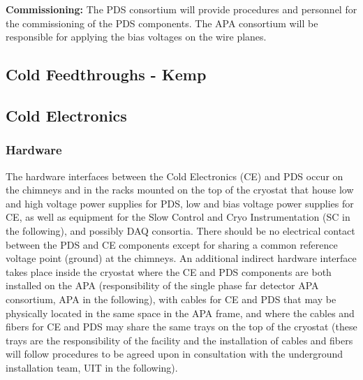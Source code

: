
\textbf{Commissioning: }
The PDS consortium will provide procedures and personnel for the commissioning of the PDS components.
The APA consortium will be responsible for applying the bias voltages on the wire planes. 

\subsection{\color{red}\bf Cold Feedthroughs - Kemp}
\label{sec:fdsp-pd-intfc-feed}


\subsection{Cold Electronics}
\label{sec:fdsp-pd-intfc-feed}

\subsubsection{Hardware}
The hardware interfaces between the Cold Electronics (CE) and PDS occur on the chimneys and in the racks mounted on the top of the cryostat that house low and high voltage power supplies for PDS, low and bias voltage power supplies for CE, as well as equipment for the Slow Control and Cryo Instrumentation (SC in the following), and possibly DAQ consortia. There should be no electrical contact between the PDS and CE components except for sharing a common reference voltage point (ground) at the chimneys. An additional indirect hardware interface takes place inside the cryostat where the CE and PDS components are both installed on the APA (responsibility of the single phase far detector APA consortium, APA in the following), with cables for CE and PDS that may be physically located in the same space in the APA frame, and where the cables and fibers for CE and PDS may share the same trays on the top of the cryostat (these trays are the responsibility of the facility and the installation of cables and fibers will follow procedures to be agreed upon in consultation with the underground installation team, UIT in the following).

